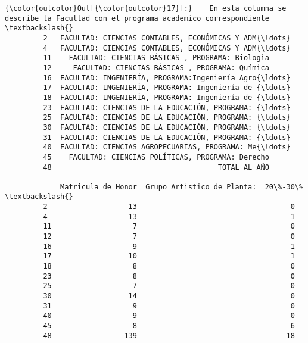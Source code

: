 \documentclass[11pt]{article}
\begin{document}
\begin{Verbatim}[commandchars=\\\{\}]
{\color{outcolor}Out[{\color{outcolor}17}]:}    En esta columna se describe la Facultad con el programa academico correspondiente   \textbackslash{}
         2   FACULTAD: CIENCIAS CONTABLES, ECONÓMICAS Y ADM{\ldots}                                   
         4   FACULTAD: CIENCIAS CONTABLES, ECONÓMICAS Y ADM{\ldots}                                   
         11    FACULTAD: CIENCIAS BÁSICAS , PROGRAMA: Biologìa                                   
         12     FACULTAD: CIENCIAS BÁSICAS , PROGRAMA: Química                                   
         16  FACULTAD: INGENIERÍA, PROGRAMA:Ingeniería Agro{\ldots}                                   
         17  FACULTAD: INGENIERÍA, PROGRAMA: Ingeniería de {\ldots}                                   
         18  FACULTAD: INGENIERÍA, PROGRAMA: Ingeniería de {\ldots}                                   
         23  FACULTAD: CIENCIAS DE LA EDUCACIÓN, PROGRAMA: {\ldots}                                   
         25  FACULTAD: CIENCIAS DE LA EDUCACIÓN, PROGRAMA: {\ldots}                                   
         30  FACULTAD: CIENCIAS DE LA EDUCACIÓN, PROGRAMA: {\ldots}                                   
         31  FACULTAD: CIENCIAS DE LA EDUCACIÓN, PROGRAMA: {\ldots}                                   
         40  FACULTAD: CIENCIAS AGROPECUARIAS, PROGRAMA: Me{\ldots}                                   
         45    FACULTAD: CIENCIAS POLÍTICAS, PROGRAMA: Derecho                                   
         48                                       TOTAL AL AÑO                                   
         
             Matricula de Honor  Grupo Artistico de Planta:  20\%-30\%  \textbackslash{}
         2                   13                                    0   
         4                   13                                    1   
         11                   7                                    0   
         12                   7                                    0   
         16                   9                                    1   
         17                  10                                    1   
         18                   8                                    0   
         23                   8                                    0   
         25                   7                                    0   
         30                  14                                    0   
         31                   9                                    0   
         40                   9                                    0   
         45                   8                                    6   
         48                 139                                   18   
         

\end{Verbatim}
\end{document}
